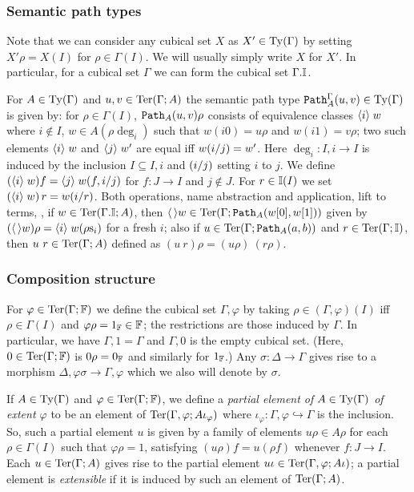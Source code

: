 \subsubsection*{Semantic path types}

Note that we can consider any cubical set $X$ as $X' \in \operatorname{Ty} (\Gamma)$
by setting $X' \rho = X (I)$ for $\rho \in \Gamma (I)$.  We will
usually simply write $X$ for $X'$.  In particular, for a cubical set
$\Gamma$ we can form the cubical set $\Gamma.\mathbb{I}$.

For $A \in \operatorname{Ty} (\Gamma)$ and $u,v \in \operatorname{Ter} (\Gamma;A)$ the semantic
path type $\mathtt{Path}^\Gamma_A (u,v) \in \operatorname{Ty} (\Gamma)$ is given by: for
$\rho \in \Gamma (I)$, $\mathtt{Path}_A (u,v) \rho$ consists of equivalence
classes ${\langle}i{\rangle} \; w$ where $i \notin I$, $w \in A (\rho \deg_i)$ such
that $w (i0) = u \rho$ and $w (i1) = v \rho$; two such elements ${\langle}i{\rangle} \; w$ and ${\langle}j{\rangle} \; {w'}$ are equal if{f} $w (i/j) = w'$.  Here
$\deg_i \colon I,i \to I$ is induced by the inclusion $I \subseteq
I,i$ and $(i/j)$ setting $i$ to $j$.  We define $({\langle}i{\rangle} \; w) f =
{\langle}j{\rangle} \; {w (f,i/j)}$ for $f \colon J \to I$ and $j \notin J$.  For $r
\in \mathbb{I} (I)$ we set $({\langle}i{\rangle} \; w) \, r = w (i/r)$.  Both
operations, name abstraction and application, lift to terms, \ie{}, if
$w \in \operatorname{Ter} (\Gamma.\mathbb{I};A)$, then $\langle \, \rangle w \in \operatorname{Ter} (\Gamma; \mathtt{Path}_A
(w [0], w[1]))$ given by $(\langle \, \rangle w) \rho = {\langle}i{\rangle} \; w (\rho \mathrm{s}_i)$
for a fresh $i$; also if $u \in \operatorname{Ter} (\Gamma;\mathtt{Path}_A(a,b))$ and $r
\in \operatorname{Ter} (\Gamma; \mathbb{I})$, then $u ~ r \in \operatorname{Ter} (\Gamma;A)$ defined as
$(u ~r) \rho = (u \rho) ~(r \rho)$.

\subsubsection*{Composition structure}


For $\varphi \in \operatorname{Ter} (\Gamma;\mathbb{F})$ we define the cubical set
$\Gamma,\varphi$ by taking $\rho \in (\Gamma,\varphi) (I)$ if{f} $\rho
\in \Gamma (I)$ and $\varphi \rho = 1_{\mathbb{F}} \in \mathbb{F}$; the restrictions
are those induced by $\Gamma$.  In particular, we have $\Gamma,1 =
\Gamma$ and $\Gamma,0$ is the empty cubical set.  (Here, $0 \in \operatorname{Ter}
(\Gamma;\mathbb{F})$ is $0 \rho = 0_{\mathbb{F}}$ and similarly for $1_{\mathbb{F}}$.)  Any
$\sigma \colon \Delta \to \Gamma$ gives rise to a morphism
$\Delta,\varphi \sigma \to \Gamma, \varphi$ which we also will denote
by $\sigma$.

If $A \in \operatorname{Ty}(\Gamma)$ and $\varphi \in \operatorname{Ter}(\Gamma;\mathbb{F})$, we define a
\emph{partial element of $A \in \operatorname{Ty} (\Gamma)$ of extent $\varphi$} to
be an element of $\operatorname{Ter} (\Gamma,\varphi; A \iota_\varphi)$ where
$\iota_\varphi \colon \Gamma,\varphi \hookrightarrow \Gamma$ is the
inclusion. So, such a partial element $u$ is given by a family of
elements $u \rho \in A \rho$ for each $\rho \in \Gamma (I)$ such that
$\varphi \rho = 1$, satisfying $(u \rho) f = u (\rho f)$ whenever
$f \colon J \to I$.  Each $u \in \operatorname{Ter} (\Gamma;A)$ gives rise to the
partial element $u \iota \in \operatorname{Ter}(\Gamma,\varphi; A\iota)$; a partial
element is \emph{extensible} if it is induced by such an element of
$\operatorname{Ter}(\Gamma;A)$.


